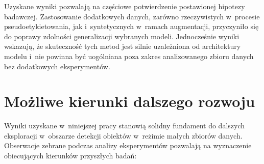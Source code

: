 Uzyskane wyniki pozwalają na częściowe potwierdzenie postawionej hipotezy badawczej. Zastosowanie dodatkowych danych, zarówno rzeczywistych w~procesie pseudoetykietowania, jak i~syntetycznych w~ramach augmentacji, przyczyniło się do poprawy zdolności generalizacji wybranych modeli. Jednocześnie wyniki wskazują, że skuteczność tych metod jest silnie uzależniona od architektury modelu i~nie powinna być uogólniana poza zakres analizowanego zbioru danych bez dodatkowych eksperymentów.

\section{Możliwe kierunki dalszego rozwoju}

Wyniki uzyskane w~niniejszej pracy stanowią solidny fundament do dalszych eksploracji w~obszarze detekcji obiektów w~reżimie małych zbiorów danych. Obserwacje zebrane podczas analizy eksperymentów pozwalają na wyznaczenie obiecujących kierunków przyszłych badań:

